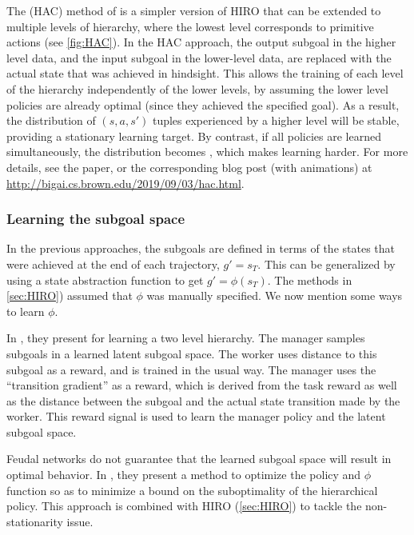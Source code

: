 The  (HAC) method
of \citep{Levy2018} is a simpler version of HIRO that can be extended
to multiple levels of hierarchy,
where the lowest level corresponds to primitive actions
(see \cref{fig:HAC}).
In the HAC approach, the output subgoal in the higher level data,
and the input subgoal in the lower-level data,
are replaced with the actual state that was achieved
in hindsight. This allows
the training of  each level of the
hierarchy independently of the lower levels,
by assuming  the lower level policies are already optimal
(since they achieved the specified goal).
As a result, the distribution of
$(s,a,s')$ tuples experienced by a higher level
will be stable,  providing a  stationary learning target.
By contrast, if all policies are learned simultaneously,
the distribution becomes ,
which makes learning harder.
For more details, see the paper,
or the corresponding blog post (with animations)
at  \url{http://bigai.cs.brown.edu/2019/09/03/hac.html}.


\subsubsection{Learning the subgoal space}

In the previous approaches, the subgoals are defined
in terms of the states that were achieved at the end
of each trajectory, $g'=s_T$. This can be generalized
by using a state abstraction function to get
$g'=\phi(s_T)$.
The methods in \cref{sec:HIRO})
assumed that $\phi$ was manually
specified.
We now mention some ways to learn $\phi$.

In \citep{Vezhnevets2017}, they present
 for learning a two level hierarchy.
The manager samples subgoals in a learned latent subgoal space.
The worker uses distance to this subgoal as a reward,
and is trained in the usual way.
The manager uses the ``transition gradient'' as a reward,
which is derived from the task reward as well as the
distance between the subgoal and the actual state transition
made by the worker. This reward signal is used to learn
the manager policy and the latent subgoal space.

Feudal networks do not guarantee that the learned subgoal
space will result in optimal behavior.
In \citep{Nachum2019}, they present
a method to optimize the policy and $\phi$ function
so as to minimize a bound on the suboptimality of the hierarchical
policy.
This approach is combined with HIRO
(\cref{sec:HIRO}) to tackle the non-stationarity issue.




